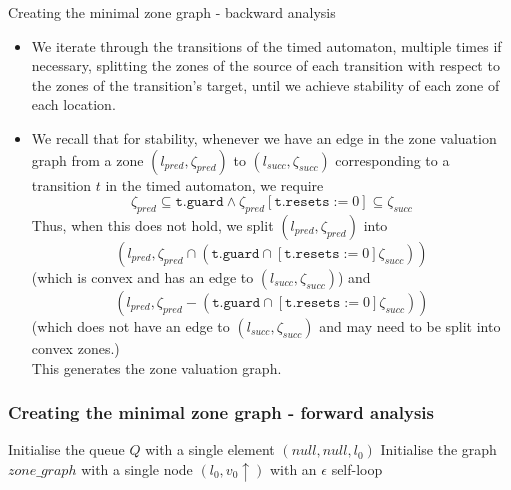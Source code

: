\documentclass{beamer}
\begin{document}
\begin{frame}[shrink = 10]{Creating the minimal zone graph - backward analysis}

\begin{itemize}

\item We
iterate through the transitions of the timed automaton, multiple times
if necessary, splitting the zones of the source of each transition
with respect to the zones of the transition's target, until we achieve
stability of each zone of each location.

\item We recall that for stability,
whenever we have an edge in the zone valuation graph from a zone
$(l_{pred}, \zeta _{pred})$ to $(l_{succ}, \zeta _{succ})$
corresponding to a transition $t$ in the timed automaton, we require 
\begin{displaymath} 
  \zeta _{pred} \subseteq \texttt{t.guard}
  \wedge
  \zeta _{pred} [\texttt{t.resets} := 0] \subseteq \zeta _{succ}
\end{displaymath} 
Thus, when this does not hold, we split $(l_{pred}, \zeta _{pred})$
into
\begin{displaymath} 
  (l_{pred}, \zeta _{pred} \cap (\texttt{t.guard} \cap [\texttt{t.resets} := 0] \zeta _{succ}))
\end{displaymath} 
(which is convex and has an edge to $(l_{succ}, \zeta _{succ})$)
and
\begin{displaymath} 
  (l_{pred}, \zeta _{pred} - (\texttt{t.guard} \cap [\texttt{t.resets} := 0] \zeta _{succ}))
\end{displaymath} 
(which does not have an edge to $(l_{succ}, \zeta _{succ})$ and may
need to be split into convex zones.) \\
This generates the zone valuation graph.

\end{itemize}

\end{frame}

\begin{frame}[fragile, shrink=20]
  \frametitle{Creating the minimal zone graph - forward analysis}

  \begin{algorithm2e}[H]
    Initialise the queue $Q$ with a single element $(null, null, l_0)$\;
    Initialise the graph $zone\_graph$ with a single node $(l_0, v_0 \uparrow)$
    with an $\epsilon$ self-loop\;
  \end{algorithm2e}
\end{frame}
\end{document}
